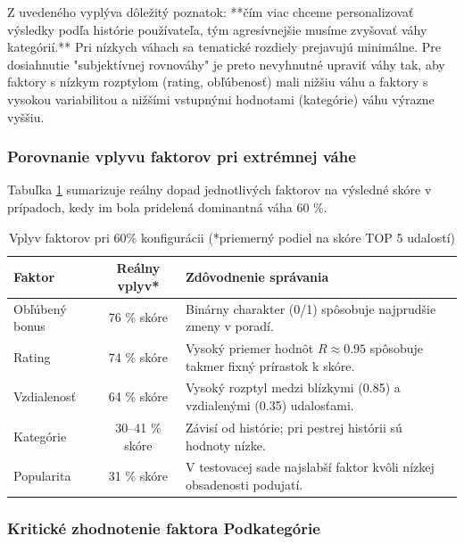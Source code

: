 \documentclass[12pt,a4paper]{article}
\begin{document}
Z uvedeného vyplýva dôležitý poznatok: **čím viac chceme personalizovať výsledky podľa histórie používateľa, tým agresívnejšie musíme zvyšovať váhy kategórií.** Pri nízkych váhach sa tematické rozdiely prejavujú minimálne. Pre dosiahnutie "subjektívnej rovnováhy" je preto nevyhnutné upraviť váhy tak, aby faktory s nízkym rozptylom (rating, obľúbenosť) mali nižšiu váhu a faktory s vysokou variabilitou a nižšími vstupnými hodnotami (kategórie) váhu výrazne vyššiu.
\subsubsection{Porovnanie vplyvu faktorov pri extrémnej váhe}

Tabuľka \ref{tab:vplyv_faktorov} sumarizuje reálny dopad jednotlivých faktorov na výsledné skóre v prípadoch, kedy im bola pridelená dominantná váha 60 \%.

\begin{table}[H]
\centering
\small
\begin{tabular}{|l|c|p{9cm}|}
\hline
\textbf{Faktor} & \textbf{Reálny vplyv*} & \textbf{Zdôvodnenie správania} \\
\hline
Obľúbený bonus & 76 \% skóre & Binárny charakter (0/1) spôsobuje najprudšie zmeny v poradí. \\
\hline
Rating & 74 \% skóre & Vysoký priemer hodnôt $R \approx 0.95$ spôsobuje takmer fixný prírastok k skóre. \\
\hline
Vzdialenosť & 64 \% skóre & Vysoký rozptyl medzi blízkymi (0.85) a vzdialenými (0.35) udalosťami. \\
\hline
Kategórie & 30--41 \% skóre & Závisí od histórie; pri pestrej histórii sú hodnoty nízke. \\
\hline
Popularita & 31 \% skóre & V testovacej sade najslabší faktor kvôli nízkej obsadenosti podujatí. \\
\hline
\end{tabular}
\caption{Vplyv faktorov pri 60\% konfigurácii (*priemerný podiel na skóre TOP 5 udalostí)}
\label{tab:vplyv_faktorov}
\end{table}



\subsubsection{Kritické zhodnotenie faktora Podkategórie}
\end{document}
